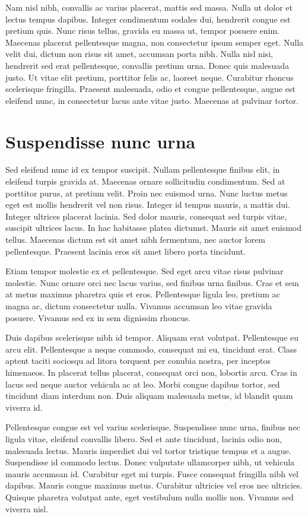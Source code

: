 Nam nisl nibh, convallis ac varius placerat, mattis sed massa. Nulla ut dolor et lectus tempus dapibus. Integer condimentum sodales dui, hendrerit congue est pretium quis. Nunc risus tellus, gravida eu massa ut, tempor posuere enim. Maecenas placerat pellentesque magna, non consectetur ipsum semper eget. Nulla velit dui, dictum non risus sit amet, accumsan porta nibh. Nulla nisl nisi, hendrerit sed erat pellentesque, convallis pretium urna. Donec quis malesuada justo. Ut vitae elit pretium, porttitor felis ac, laoreet neque. Curabitur rhoncus scelerisque fringilla. Praesent malesuada, odio et congue pellentesque, augue est eleifend nunc, in consectetur lacus ante vitae justo. Maecenas at pulvinar tortor.

\section{Suspendisse nunc urna}
Sed eleifend nunc id ex tempor suscipit. Nullam pellentesque finibus elit, in eleifend turpis gravida at. Maecenas ornare sollicitudin condimentum. Sed at porttitor purus, at pretium velit. Proin nec euismod urna. Nunc luctus metus eget est mollis hendrerit vel non risus. Integer id tempus mauris, a mattis dui. Integer ultrices placerat lacinia. Sed dolor mauris, consequat sed turpis vitae, suscipit ultrices lacus. In hac habitasse platea dictumst. Mauris sit amet euismod tellus. Maecenas dictum est sit amet nibh fermentum, nec auctor lorem pellentesque. Praesent lacinia eros sit amet libero porta tincidunt.

Etiam tempor molestie ex et pellentesque. Sed eget arcu vitae risus pulvinar molestie. Nunc ornare orci nec lacus varius, sed finibus urna finibus. Cras et sem at metus maximus pharetra quis et eros. Pellentesque ligula leo, pretium ac magna ac, dictum consectetur nulla. Vivamus accumsan leo vitae gravida posuere. Vivamus sed ex in sem dignissim rhoncus.

Duis dapibus scelerisque nibh id tempor. Aliquam erat volutpat. Pellentesque eu arcu elit. Pellentesque a neque commodo, consequat mi eu, tincidunt erat. Class aptent taciti sociosqu ad litora torquent per conubia nostra, per inceptos himenaeos. In placerat tellus placerat, consequat orci non, lobortis arcu. Cras in lacus sed neque auctor vehicula ac at leo. Morbi congue dapibus tortor, sed tincidunt diam interdum non. Duis aliquam malesuada metus, id blandit quam viverra id.

Pellentesque congue est vel varius scelerisque. Suspendisse nunc urna, finibus nec ligula vitae, eleifend convallis libero. Sed et ante tincidunt, lacinia odio non, malesuada lectus. Mauris imperdiet dui vel tortor tristique tempus et a augue. Suspendisse id commodo lectus. Donec vulputate ullamcorper nibh, ut vehicula mauris accumsan id. Curabitur eget mi turpis. Fusce consequat fringilla nibh vel dapibus. Mauris congue maximus metus. Curabitur ultricies vel eros nec ultricies. Quisque pharetra volutpat ante, eget vestibulum nulla mollis non. Vivamus sed viverra nisl.

